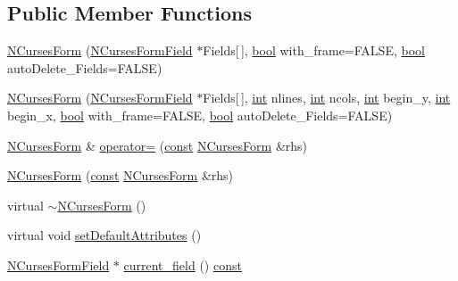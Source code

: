 \subsection*{Public Member Functions}
\begin{DoxyCompactItemize}
\item 
\hyperlink{class_n_curses_form_ac1112030f440b575a5527c536201da82}{N\-Curses\-Form} (\hyperlink{class_n_curses_form_field}{N\-Curses\-Form\-Field} $\ast$Fields\mbox{[}$\,$\mbox{]}, \hyperlink{term__entry_8h_a002004ba5d663f149f6c38064926abac}{bool} with\-\_\-frame=F\-A\-L\-S\-E, \hyperlink{term__entry_8h_a002004ba5d663f149f6c38064926abac}{bool} auto\-Delete\-\_\-\-Fields=F\-A\-L\-S\-E)
\item 
\hyperlink{class_n_curses_form_a9b33ff31445f687500a167ebe23c2b38}{N\-Curses\-Form} (\hyperlink{class_n_curses_form_field}{N\-Curses\-Form\-Field} $\ast$Fields\mbox{[}$\,$\mbox{]}, \hyperlink{term__entry_8h_ad65b480f8c8270356b45a9890f6499ae}{int} nlines, \hyperlink{term__entry_8h_ad65b480f8c8270356b45a9890f6499ae}{int} ncols, \hyperlink{term__entry_8h_ad65b480f8c8270356b45a9890f6499ae}{int} begin\-\_\-y, \hyperlink{term__entry_8h_ad65b480f8c8270356b45a9890f6499ae}{int} begin\-\_\-x, \hyperlink{term__entry_8h_a002004ba5d663f149f6c38064926abac}{bool} with\-\_\-frame=F\-A\-L\-S\-E, \hyperlink{term__entry_8h_a002004ba5d663f149f6c38064926abac}{bool} auto\-Delete\-\_\-\-Fields=F\-A\-L\-S\-E)
\item 
\hyperlink{class_n_curses_form}{N\-Curses\-Form} \& \hyperlink{class_n_curses_form_a1f5b5272d760e943bff884b7c459db2b}{operator=} (\hyperlink{term__entry_8h_a57bd63ce7f9a353488880e3de6692d5a}{const} \hyperlink{class_n_curses_form}{N\-Curses\-Form} \&rhs)
\item 
\hyperlink{class_n_curses_form_a3754e527af15a0dc9bb2a908c90f3832}{N\-Curses\-Form} (\hyperlink{term__entry_8h_a57bd63ce7f9a353488880e3de6692d5a}{const} \hyperlink{class_n_curses_form}{N\-Curses\-Form} \&rhs)
\item 
virtual \hyperlink{class_n_curses_form_a82aa5551831a93cae6bd6593f61787d9}{$\sim$\-N\-Curses\-Form} ()
\item 
virtual void \hyperlink{class_n_curses_form_a2b80f020e0f746c15a845c0c86c1ea87}{set\-Default\-Attributes} ()
\item 
\hyperlink{class_n_curses_form_field}{N\-Curses\-Form\-Field} $\ast$ \hyperlink{class_n_curses_form_a46683be80a4ed98cda068491020fa793}{current\-\_\-field} () \hyperlink{term__entry_8h_a57bd63ce7f9a353488880e3de6692d5a}{const} 
\item 

\end{DoxyCompactItemize}
